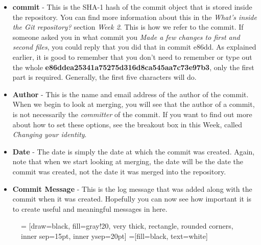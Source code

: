 \begin{itemize}
\item \textbf{commit} - This is the SHA-1 hash of the commit object that is stored inside the repository.  You can find more information about this in the \emph{What's inside the Git repository?} section \emph{Week 2}.  This is how we refer to the commit.  If someone asked you in what commit you \emph{Made a few changes to first and second files}, you could reply that you did that in commit e86dd.  As explained earlier, it is good to remember that you don't need to remember or type out the whole \textbf{e86ddea25341a75275d316d8ca545aa7c73e97b3}, only the first part is required.  Generally, the first five characters will do.
\item \textbf{Author} - This is the name and email address of the author of the commit.  When we begin to look at merging, you will see that the author of a commit, is not necessarily the \emph{committer} of the commit.  If you want to find out more about how to set these options, see the breakout box in this Week, called \emph{Changing your identity}.
\item \textbf{Date} - The date is simply the date at which the commit was created.  Again, note that when we start looking at merging, the date will be the date the commit was created, not the date it was merged into the repository.
\item \textbf{Commit Message} - This is the log message that was added along with the commit when it was created.  Hopefully you can now see how important it is to create useful and meaningful messages in here.
\end{itemize}

\begin{figure}[hbt]
 = [draw=black, fill=gray!20, very thick, rectangle, rounded corners, inner sep=15pt, inner ysep=20pt]
 =[fill=black, text=white]
\end{figure}

